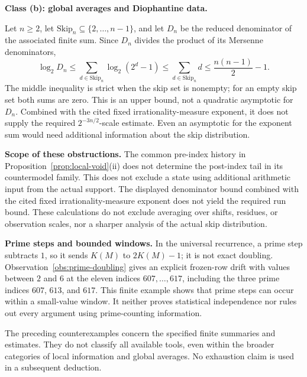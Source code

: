 \textbf{Class (b): global averages and Diophantine data.}

\begin{prop}
\label{prop:exponent-gap}
Let $n\ge2$, let $\mathrm{Skip}_n\subseteq\{2,\ldots,n-1\}$,
and let $D_n$ be the reduced denominator of the associated finite sum.
Since $D_n$ divides the product of its Mersenne denominators,
\[
 \log_2D_n\le\sum_{d\in\mathrm{Skip}_n}\log_2(2^d-1)
 \le\sum_{d\in\mathrm{Skip}_n}d\le\frac{n(n-1)}2-1.
\]
The middle inequality is strict when the skip set is nonempty; for an
empty skip set both sums are zero.  This is an upper bound, not a
quadratic asymptotic for $D_n$.  Combined with the cited fixed
irrationality-measure exponent, it does not supply the required
$2^{-3n/2}$-scale estimate.  Even an asymptotic for the exponent sum would
need additional information about the skip distribution.
\end{prop}

\textbf{Scope of these obstructions.} The common pre-index history in
Proposition~\ref{prop:local-void}(ii) does not determine the post-index
tail in its countermodel family.  This does not exclude a state using
additional arithmetic input from the actual support.  The displayed
denominator bound combined with the cited fixed irrationality-measure
exponent does not yield the required run bound. These calculations do not
exclude averaging over shifts, residues, or observation scales, nor a sharper analysis of the
actual skip distribution.

\textbf{Prime steps and bounded windows.} In the universal recurrence,
a prime step subtracts $1$, so it sends $K(M)$ to $2K(M)-1$; it is
not exact doubling.  Observation~\ref{obs:prime-doubling} gives an
explicit frozen-row drift with values between $2$ and $6$ at the eleven
indices $607,\ldots,617$, including the three prime indices $607$, $613$,
and $617$.  This finite example shows that prime steps can occur within
a small-value window.  It neither proves statistical independence nor
rules out every argument using prime-counting information.

\begin{rem}
The preceding counterexamples concern the specified finite summaries and
estimates.  They do not classify all available tools, even within the
broader categories of local information and global averages.  No exhaustion
claim is used in a subsequent deduction.
\end{rem}

